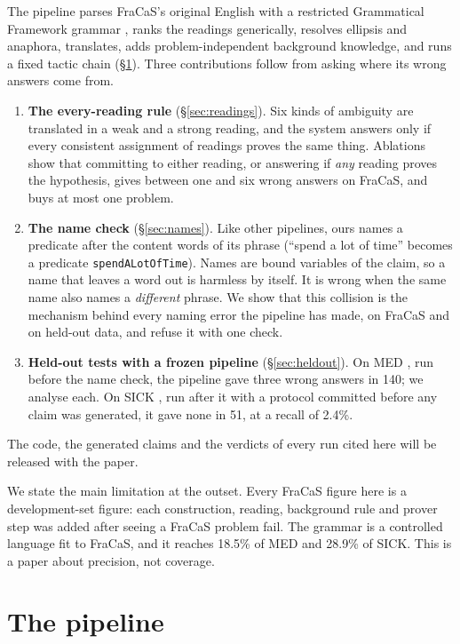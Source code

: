 \documentclass[11pt]{article}
\newcommand{\nm}[1]{\texttt{#1}}
\begin{document}
The pipeline parses FraCaS's original English
\citep{cooper-etal-1996-fracas} with a restricted Grammatical Framework
grammar \citep{ranta-2011-gf}, ranks the readings generically, resolves
ellipsis and anaphora, translates, adds problem-independent background
knowledge, and runs a fixed tactic chain (\S\ref{sec:pipeline}). Three
contributions follow from asking where its wrong answers come from.

\begin{enumerate}
\item \textbf{The every-reading rule} (\S\ref{sec:readings}). Six kinds
of ambiguity are translated in a weak and a strong reading, and the
system answers only if every consistent assignment of readings proves
the same thing. Ablations show that committing to either reading, or
answering if \emph{any} reading proves the hypothesis, gives between
one and six wrong answers on FraCaS, and buys at most one problem.
\item \textbf{The name check} (\S\ref{sec:names}). Like other
pipelines, ours names a predicate after the content words of its
phrase (``spend a lot of time'' becomes a predicate
\nm{spendALotOfTime}). Names are bound variables of the claim, so a
name that leaves a word out is harmless by itself. It is wrong when the
same name also names a \emph{different} phrase. We show that this
collision is the mechanism behind every naming error the pipeline has
made, on FraCaS and on held-out data, and refuse it with one check.
\item \textbf{Held-out tests with a frozen pipeline} (\S\ref{sec:heldout}).
On MED \citep{yanaka-etal-2019-neural}, run before the name check, the
pipeline gave three wrong answers in 140; we analyse each. On SICK
\citep{marelli-etal-2014-sick}, run after it with a protocol committed
before any claim was generated, it gave none in 51, at a recall of 2.4\%.
\end{enumerate}
The code, the generated claims and the verdicts of every run cited here
will be released with the paper.

We state the main limitation at the outset. Every FraCaS figure here is
a development-set figure: each construction, reading, background rule
and prover step was added after seeing a FraCaS problem fail. The
grammar is a controlled language fit to FraCaS, and it reaches 18.5\% of
MED and 28.9\% of SICK. This is a paper about precision, not coverage.

\section{The pipeline}
\label{sec:pipeline}
\end{document}
